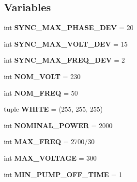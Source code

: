 \subsection*{Variables}
\begin{DoxyCompactItemize}
\item 
\mbox{\label{namespaceED2050_a549e617fd742cade958099e38d1b63f3}} 
int {\bfseries S\+Y\+N\+C\+\_\+\+M\+A\+X\+\_\+\+P\+H\+A\+S\+E\+\_\+\+D\+EV} = 20
\item 
\mbox{\label{namespaceED2050_a94476e0eff1aee3128f539902fa0c72d}} 
int {\bfseries S\+Y\+N\+C\+\_\+\+M\+A\+X\+\_\+\+V\+O\+L\+T\+\_\+\+D\+EV} = 15
\item 
\mbox{\label{namespaceED2050_a1ff5c4ef406ab0d22da0331e959d3126}} 
int {\bfseries S\+Y\+N\+C\+\_\+\+M\+A\+X\+\_\+\+F\+R\+E\+Q\+\_\+\+D\+EV} = 2
\item 
\mbox{\label{namespaceED2050_ac5e5c1ff7becb9c947583d8131a5ecf7}} 
int {\bfseries N\+O\+M\+\_\+\+V\+O\+LT} = 230
\item 
\mbox{\label{namespaceED2050_a20234bd15870cbfb5b38628569f21f3c}} 
int {\bfseries N\+O\+M\+\_\+\+F\+R\+EQ} = 50
\item 
\mbox{\label{namespaceED2050_a25463050e7dbc8098d898a3e6bba96bc}} 
tuple {\bfseries W\+H\+I\+TE} = (255, 255, 255)
\item 
\mbox{\label{namespaceED2050_aa0ce4af935544f85880eb7a20a007fbf}} 
int {\bfseries N\+O\+M\+I\+N\+A\+L\+\_\+\+P\+O\+W\+ER} = 2000
\item 
\mbox{\label{namespaceED2050_a7081d572ca82d446130a150ace3a689f}} 
int {\bfseries M\+A\+X\+\_\+\+F\+R\+EQ} = 2700/30
\item 
\mbox{\label{namespaceED2050_a81d3db40b73411b6c51e486bd72fa64f}} 
int {\bfseries M\+A\+X\+\_\+\+V\+O\+L\+T\+A\+GE} = 300
\item 
\mbox{\label{namespaceED2050_a9caae4b4bd1899f447d346cb52220f6d}} 
int {\bfseries M\+I\+N\+\_\+\+P\+U\+M\+P\+\_\+\+O\+F\+F\+\_\+\+T\+I\+ME} = 1

\end{DoxyCompactItemize}

